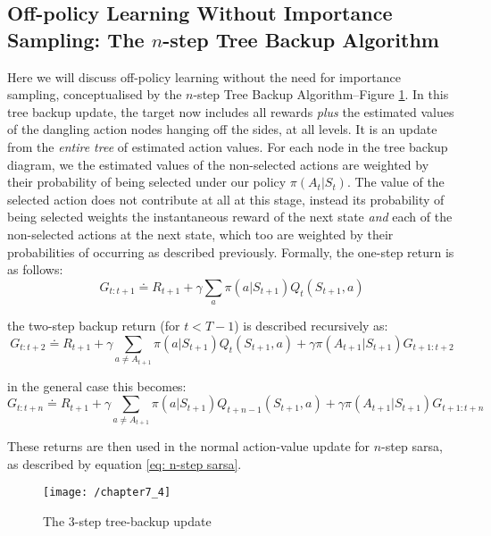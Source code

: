 \subsection{Off-policy Learning Without Importance Sampling: The $n$-step Tree Backup Algorithm}
Here we will discuss off-policy learning without the need for importance sampling, conceptualised by the $n$-step Tree Backup Algorithm–Figure \ref{fig: tree-backup update}. In this tree backup update, the target now includes all rewards \textit{plus} the estimated values of the dangling action nodes hanging off the sides, at all levels. It is an update from the \textit{entire tree} of estimated action values. For each node in the tree backup diagram, we the estimated values of the non-selected actions are weighted  by their probability of being selected under our policy $\pi(A_t|S_t)$. The value of the selected action does not contribute at all at this stage, instead its probability of being selected weights the instantaneous reward of the next state \textit{and} each of the non-selected actions at the next state, which too are weighted by their probabilities of occurring as described previously. Formally, the one-step return is as follows:
\begin{equation}
G_{t:t+1} \doteq R_{t+1} + \gamma \sum_{a} \pi(a | S_{t+1}) Q_t(S_{t+1}, a)
\end{equation}

the two-step backup return (for $t < T - 1$) is described recursively as:
\begin{equation}
G_{t:t+2} \doteq R_{t+1} + \gamma \sum_{a \neq A_{t+1}} \pi(a | S_{t+1}) Q_t(S_{t+1}, a) + \gamma \pi(A_{t+1} | S_{t+1})G_{t+1:t+2}
\end{equation}

in the general case this becomes:
\begin{equation}
G_{t:t+n} \doteq R_{t+1} + \gamma \sum_{a \neq A_{t+1}} \pi(a | S_{t+1}) Q_{t+n-1}(S_{t+1}, a) + \gamma \pi(A_{t+1} | S_{t+1})G_{t+1:t+n}
\end{equation}

These returns are then used in the normal action-value update for $n$-step sarsa, as described by equation \ref{eq: n-step sarsa}.

\begin{figure}
	\centering
	\texttt{[image: /chapter7\_4]}
	\caption{The 3-step tree-backup update}
	\label{fig: tree-backup update}
\end{figure}

